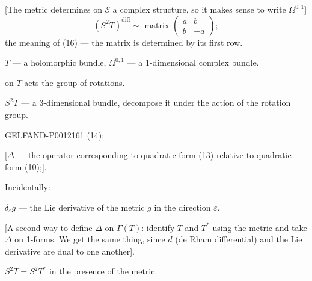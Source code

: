 [The metric determines on \(\mathcal E\) a complex structure, so it makes sense to write \(\Omega^{0,1}\)]
\[
(S^2T)^{\mathrm{diff}}\sim\text{-matrix }\begin{pmatrix}a&b\\b&-a\end{pmatrix};
\]
the meaning of (16) --- the matrix is determined by its first row.

\(T\) --- a holomorphic bundle, \(\Omega^{0,1}\) --- a 1-dimensional complex bundle.

\underline{on \(T\) acts} the group of rotations.

\(S^2T\) --- a 3-dimensional bundle, decompose it under the action of the rotation group.


\begin{GelfandAdjacentEvidence}{GELFAND-P001216}{1}
 (14):

[\(\Delta\) --- the operator corresponding to quadratic form (13) relative to quadratic form (10);].

Incidentally:

\(\delta_\varepsilon g\) --- the Lie derivative of the metric \(g\) in the direction \(\varepsilon\).

[A second way to define \(\Delta\) on \(\Gamma(T)\): identify \(T\) and \(T^*\)
using the metric and take \(\Delta\) on 1-forms.
We get the same thing, since \(d\) (de Rham differential) and the Lie derivative are dual to one another].
\end{GelfandAdjacentEvidence}


\(S^2T=S^2T^*\) in the presence of the metric.


